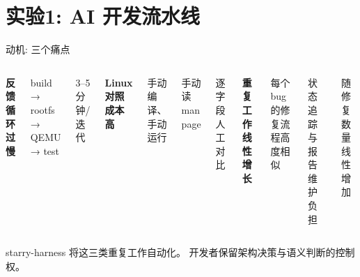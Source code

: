 \documentclass[aspectratio=169,10pt]{ctexbeamer}
\newcommand{\highlight}[1]{\textcolor{accent}{#1}}
\begin{document}

\section{实验1: AI 开发流水线}

\begin{frame}{动机: 三个痛点}
\begin{columns}[T]
\textbf{反馈循环过慢}

\vspace{1mm}
build → rootfs → QEMU → test

3--5 分钟/迭代

\textbf{Linux 对照成本高}

\vspace{1mm}
手动编译、手动运行

手动读 man page

逐字段人工对比

\textbf{重复工作线性增长}

\vspace{1mm}
每个 bug 的修复流程高度相似

状态追踪与报告维护负担

随修复数量线性增加
\end{columns}

\vspace{1.5mm}
\centering
\highlight{starry-harness} 将这三类重复工作自动化。
开发者保留架构决策与语义判断的控制权。
\end{frame}

\end{document}

